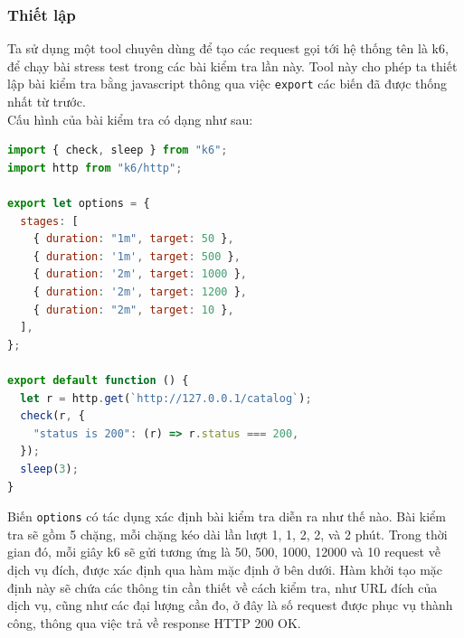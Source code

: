 \subsubsection{Thiết lập}
\noindent Ta sử dụng một tool chuyên dùng để tạo các request gọi tới hệ thống tên là k6, để chạy bài stress test trong các bài kiểm tra lần này. Tool này cho phép ta thiết lập bài kiểm tra bằng javascript thông qua việc \lstinline|export| các biến đã được thống nhất từ trước.\\[0.5cm]
Cấu hình của bài kiểm tra có dạng như sau:
\begin{lstlisting}[language=javascript]
import { check, sleep } from "k6";
import http from "k6/http";

export let options = {
  stages: [
    { duration: "1m", target: 50 },
    { duration: '1m', target: 500 },
    { duration: '2m', target: 1000 },
    { duration: '2m', target: 1200 },
    { duration: "2m", target: 10 },
  ],
};

export default function () {
  let r = http.get(`http://127.0.0.1/catalog`);
  check(r, {
    "status is 200": (r) => r.status === 200,
  });
  sleep(3);
}
\end{lstlisting}
Biến \lstinline|options| có tác dụng xác định bài kiểm tra diễn ra như thế nào. Bài kiểm tra sẽ gồm 5 chặng, mỗi chặng kéo dài lần lượt 1, 1, 2, 2, và 2 phút. Trong thời gian đó, mỗi giây k6 sẽ gửi tương ứng là 50, 500, 1000, 12000 và 10 request về dịch vụ đích, được xác định qua hàm mặc định ở bên dưới. Hàm khởi tạo mặc định này sẽ chứa các thông tin cần thiết về cách kiểm tra, như URL đích của dịch vụ, cũng như các đại lượng cần đo, ở đây là số request được phục vụ thành công, thông qua việc trả về response HTTP 200 OK.

